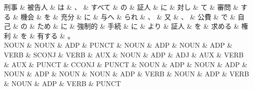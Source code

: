 \documentclass[tikz,border=5pt]{standalone}
\begin{document}
\small
\begin{dependency}[edge unit distance=12.0pt]
    \begin{deptext}[column sep=0.5em]
        刑事 \& 被告人 \& は \& 、 \& すべて \& の \& 証人 \& に \& 対し \& て \& 審問 \& する \& 機会 \& を \& 充分 \& に \& 与へ \& られ \& 、 \& 又 \& 、 \& 公費 \& で \& 自己 \& の \& ため \& に \& 強制的 \& 手続 \& に \& より \& 証人 \& を \& 求める \& 権利 \& を \& 有する \& 。\\
        NOUN \& NOUN \& ADP \& PUNCT \& NOUN \& ADP \& NOUN \& ADP \& VERB \& SCONJ \& VERB \& AUX \& NOUN \& ADP \& ADJ \& AUX \& VERB \& AUX \& PUNCT \& CCONJ \& PUNCT \& NOUN \& ADP \& NOUN \& ADP \& NOUN \& ADP \& NOUN \& NOUN \& ADP \& VERB \& NOUN \& ADP \& VERB \& NOUN \& ADP \& VERB \& PUNCT\\
    \end{deptext}
\end{dependency}
\end{document}

